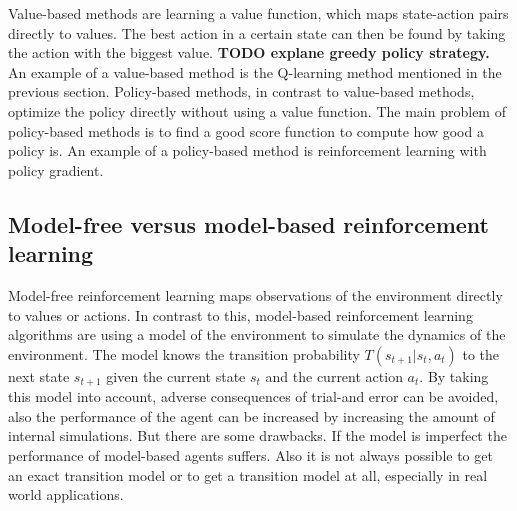 Value-based methods are learning a value function, which maps state-action pairs directly to values. The best action in a certain state can then be found by taking the action with the biggest value. 
\textbf{TODO explane greedy policy strategy.}
An example of a value-based method is the Q-learning method mentioned in the previous section.
Policy-based methods, in contrast to value-based methods, optimize the policy directly without using a value function.
The main problem of policy-based methods is to find a good score function to compute how good a policy is. An example of a policy-based method is reinforcement learning with policy gradient.\\




\subsection{Model-free versus model-based reinforcement learning}

Model-free reinforcement learning maps observations of the environment directly to values or actions.
In contrast to this, model-based reinforcement learning algorithms are using a model of the environment to simulate the dynamics of the environment. The model knows the transition probability $T(s_{t+1} | s_t, a_t)$ to the next state $s_{t+1}$ given the current state $s_t$ and the current action $a_t$. By taking this model into account, adverse consequences of trial-and error can be avoided, also the performance of the agent can be increased by increasing the amount of internal simulations.
But there are some drawbacks. If the model is imperfect the performance of model-based agents suffers. Also it is not always possible to get an exact transition model or to get a transition model at all, especially in real world applications.\\




